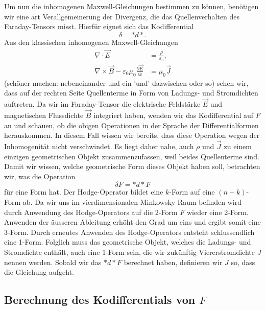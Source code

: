 Um nun die inhomogenen Maxwell-Gleichungen bestimmen zu können, benötigen wir eine art Verallgemeinerung der Divergenz, die das Quellenverhalten des Faraday-Tensors misst. Hierfür eignet sich das Kodifferential
\begin{equation*}
	\delta = \ast d {\ast}.
\end{equation*}
Aus den klassischen inhomogenen Maxwell-Gleichungen
\begin{align}
	\nabla \cdot \vec{E} &= \frac{\rho}{\varepsilon_0},\\
	\nabla \times \vec{B} - \varepsilon_0 \mu_0 \frac{\partial \vec{E}}{\partial t}&= \mu_0 \vec{J}
\end{align}
(schöner machen: nebeneinander und ein 'und' dazwischen oder so)
sehen wir, dass auf der rechten Seite Quellenterme in Form von Ladungs- und Stromdichten auftreten.
Da wir im Faraday-Tensor die elektrische Feldstärke $\vec{E}$ und magnetischen Flussdichte $\vec{B}$ integriert haben, wenden wir das Kodifferential auf $F$ an und schauen, ob die obigen Operationen in der Sprache der Differentialformen herauskommen.
In diesem Fall wissen wir bereits, dass diese Operation wegen der Inhomogenität nicht verschwindet.
Es liegt daher nahe, auch $\rho$ und $\vec{J}$ zu einem einzigen geometrischen Objekt zusammenzufassen, weil beides Quellenterme sind.
Damit wir wissen, welche geometrische Form dieses Objekt haben soll, betrachten wir, was die Operation 
\begin{equation*}
	\delta F = \ast d{\ast} F
\end{equation*}
für eine Form hat.
Der Hodge-Operator bildet eine $k$-Form auf eine $(n-k)$-Form ab.
Da wir uns im vierdimensionalen Minkowsky-Raum befinden wird durch Anwendung des Hodge-Operators auf die 2-Form $F$ wieder eine 2-Form.
Anwenden der äusseren Ableitung erhöht den Grad um eins und ergibt somit eine 3-Form.
Durch erneutes Anwenden des Hodge-Operators entsteht schlussendlich eine 1-Form.
Folglich muss das geometrische Objekt, welches die Ladungs- und Stromdichte enthält, auch eine 1-Form sein, die wir zukünftig Viererstromdichte $J$ nennen werden.
Sobald wir das $\ast d {\ast} F$ berechnet haben, definieren wir $J$ so, dass die Gleichung aufgeht.

\subsection{Berechnung des Kodifferentials von $F$}

